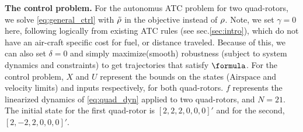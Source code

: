 \textbf{The control problem.} For the autonomus ATC problem for two quad-rotors, we solve \eqref{eq:general_ctrl}  with $\tilde{\rho}$ in the objective instead of $\rho$.
Note, we set $\gamma=0$ here, following logically from existing ATC rules (see sec.\ref{sec:intro}), which do not have an air-craft specific cost for fuel, or distance traveled. Because of this, we can also set $\delta=0$ and simply maximize(smooth) robustness (subject to system dynamics and constraints) to get trajectories that satisfy $\formula$.
For the control problem, $X$ and $U$ represent the bounds on the states ($\text{Airspace}$ and velocity limits) and inputs respectively, for both quad-rotors. $f$ represents the linearized dynamics of \eqref{eq:quad_dyn} applied to two quad-rotors, and $N=21$. The initial state for the first quad-rotor is $[2,2,2,0,0,0]'$ and for the second, $[2, -2 , 2 ,0 ,0 ,0]'$.

